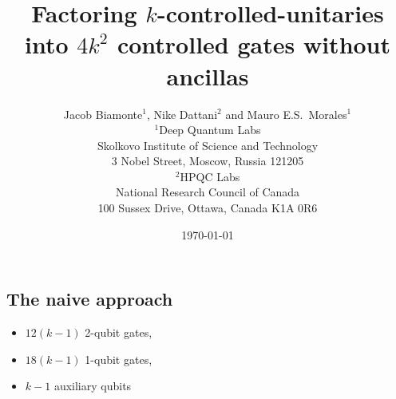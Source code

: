 \documentclass[12pt]{article}
\title{Factoring $k$-controlled-unitaries into $4k^2$ controlled gates without ancillas}
\date{\today}
\author{Jacob Biamonte$^1$, Nike Dattani$^2$ and Mauro E.S.~Morales$^1$\\$^1$Deep Quantum Labs\\ Skolkovo Institute of Science and Technology\\ 3 Nobel Street, 
Moscow, Russia 121205\\
$^2$HPQC Labs \\ National Research Council of Canada \\ 100 Sussex Drive, Ottawa, Canada K1A 0R6}
\newcommand{\1}[1]{\mathds{1}\left[#1\right]}
\begin{document}
\maketitle

\subsection{The naive approach}

\begin{itemize}
    \item $12(k-1)$ 2-qubit gates, 
    \item $18(k-1)$ 1-qubit gates, 
    \item $k-1$ auxiliary qubits
    
\end{itemize}
\end{document}
